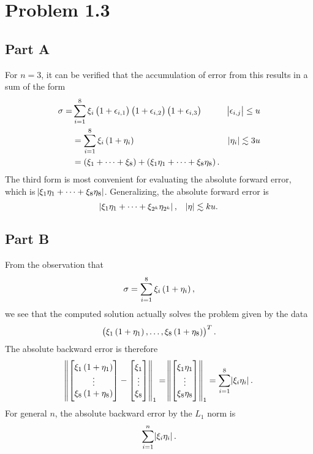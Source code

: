 \documentclass[12pt]{article}
\theoremstyle{definition}
\begin{document}
\section*{Problem 1.3}
\subsection*{Part A}
For $n = 3$, it can be verified that the accumulation of error from this results in a sum of the form
\begin{align*}
\sigma = &\sum_{i=1}^{8} \xi_i\del{1 + \epsilon_{i,1}}\del{1 + \epsilon_{i,2}}\del{1 + \epsilon_{i,3}} & \abs{\epsilon_{i,j}} \leq u \\
&= \sum_{i=1}^{8} \xi_i\del{1 + \eta_i} & \abs{\eta_i} \lesssim 3u \\
&= \del{\xi_1 + \cdots + \xi_8} + \del{\xi_1\eta_1 + \cdots + \xi_8\eta_8}.
\end{align*}
The third form is most convenient for evaluating the absolute forward error, which is $\abs{\xi_1\eta_1 + \cdots + \xi_8\eta_8}$. Generalizing, the absolute forward error is
$$
\abs{\xi_1\eta_1 + \cdots + \xi_{2^k}\eta_{2^k}}, \quad \abs{\eta} \lesssim ku.
$$

\subsection*{Part B}
From the observation that
$$
\sigma = \sum_{i=1}^8 \xi_i \del{1 + \eta_i},
$$
we see that the computed solution actually solves the problem given by the data $$\del{\xi_1\del{1+\eta_1},\dots,\xi_8\del{1+\eta_8}}^T.$$
The absolute backward error is therefore
$$
\norm{
\begin{bmatrix}
\xi_1\del{1+\eta_1} \\
\vdots \\
\xi_8\del{1+\eta_8}
\end{bmatrix}
-
\begin{bmatrix}
\xi_1 \\
\vdots \\
\xi_8
\end{bmatrix}
}_1
=
\norm{
\begin{bmatrix}
\xi_1\eta_1 \\
\vdots \\
\xi_8\eta_8
\end{bmatrix}
}_1 = \sum_{i=1}^8 \abs{\xi_i\eta_i}.
$$
For general $n$, the absolute backward error by the $L_1$ norm is
$$
\sum_{i=1}^n \abs{\xi_i\eta_i}.
$$
\end{document}
